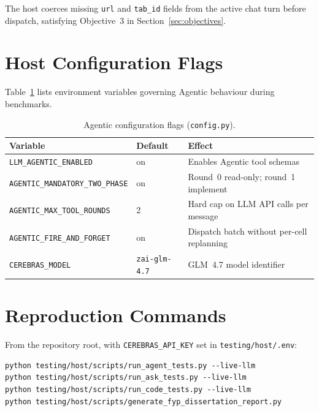 The host coerces missing \texttt{url} and \texttt{tab\_id} fields from the active chat turn before dispatch, satisfying Objective~3 in Section~\ref{sec:objectives}.

\section{Host Configuration Flags}
\label{app:config}

Table~\ref{tab:app-config} lists environment variables governing Agentic behaviour during benchmarks.

\begin{table}[!ht]
\centering
\caption{Agentic configuration flags (\texttt{config.py}).}
\label{tab:app-config}
\footnotesize
\setlength{\tabcolsep}{3pt}
\renewcommand{\arraystretch}{1.02}
\begin{tabular}[t]{|>{\raggedright\arraybackslash\ttfamily\footnotesize}p{3.65cm}|>{\raggedright\arraybackslash\ttfamily\footnotesize}p{1.85cm}|>{\raggedright\arraybackslash}p{6.05cm}|}
\hline
\textbf{Variable} & \textbf{Default} & \textbf{Effect} \\ \hline
\texttt{LLM\_AGENTIC\_ENABLED} & on & Enables Agentic tool schemas \\ \hline
\texttt{AGENTIC\_MANDATORY\_}\newline\texttt{TWO\_PHASE} & on & Round~0 read-only; round~1 implement \\ \hline
\texttt{AGENTIC\_MAX\_TOOL\_ROUNDS} & 2 & Hard cap on LLM API calls per message \\ \hline
\texttt{AGENTIC\_FIRE\_AND\_FORGET} & on & Dispatch batch without per-cell replanning \\ \hline
\texttt{CEREBRAS\_MODEL} & \texttt{zai-glm-4.7} & GLM~4.7 model identifier \\ \hline
\end{tabular}
\end{table}

\section{Reproduction Commands}
\label{app:reproduce}

From the repository root, with \texttt{CEREBRAS\_API\_KEY} set in \texttt{testing/host/.env}:

\begin{verbatim}
python testing/host/scripts/run_agent_tests.py --live-llm
python testing/host/scripts/run_ask_tests.py --live-llm
python testing/host/scripts/run_code_tests.py --live-llm
python testing/host/scripts/generate_fyp_dissertation_report.py
\end{verbatim}

